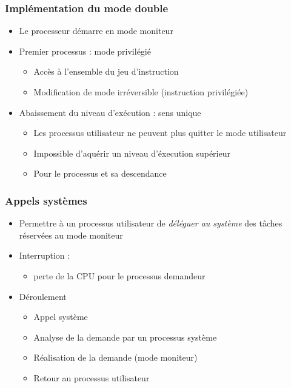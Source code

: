 \begin{frame}
 \frametitle{Implémentation du mode double}
 \begin{itemize}
 \item Le processeur démarre en mode moniteur
 \item Premier processus : mode privilégié
 \begin{itemize}
 \item Accès à l'ensemble du jeu d'instruction
 \item Modification de mode irréversible (instruction privilégiée)
 \end{itemize}
 \item Abaissement du niveau d'exécution : sens unique
  \begin{itemize}
 \item Les processus utilisateur ne peuvent plus quitter le mode utilisateur
 \item Impossible d'aquérir un niveau d'éxecution supérieur
 \item Pour le processus et sa descendance
\end{itemize}
\end{itemize}
\end{frame}


\begin{frame}
 \frametitle{Appels systèmes}
 \begin{itemize}
 \item Permettre à un processus utilisateur de \emph{déléguer au système} des tâches réservées au mode moniteur
 \item Interruption :
 \begin{itemize}
\item perte de la CPU pour le processus demandeur
\end{itemize}
 \item Déroulement
\begin{itemize}
\item Appel système
\item Analyse de la demande par un processus système
\item Réalisation de la demande (mode moniteur)
\item Retour au processus utilisateur
 \end{itemize}
 \end{itemize}
\end{frame}

